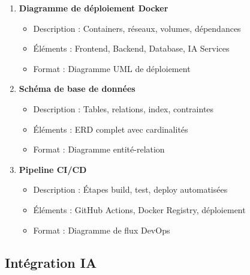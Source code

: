 \begin{enumerate}
    \item \textbf{Diagramme de déploiement Docker}
    \begin{itemize}
        \item Description : Containers, réseaux, volumes, dépendances
        \item Éléments : Frontend, Backend, Database, IA Services
        \item Format : Diagramme UML de déploiement
    \end{itemize}
    
    \item \textbf{Schéma de base de données}
    \begin{itemize}
        \item Description : Tables, relations, index, contraintes
        \item Éléments : ERD complet avec cardinalités
        \item Format : Diagramme entité-relation
    \end{itemize}
    
    \item \textbf{Pipeline CI/CD}
    \begin{itemize}
        \item Description : Étapes build, test, deploy automatisées
        \item Éléments : GitHub Actions, Docker Registry, déploiement
        \item Format : Diagramme de flux DevOps
    \end{itemize}
\end{enumerate}

\subsection{Intégration IA}

